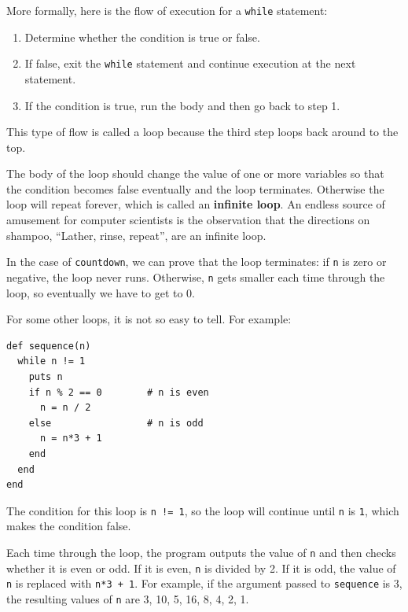\documentclass[10pt]{book}
\begin{document}
More formally, here is the flow of execution for a {\tt while} statement:

\begin{enumerate}

\item Determine whether the condition is true or false.

\item If false, exit the {\tt while} statement
and continue execution at the next statement.

\item If the condition is true, run the
body and then go back to step 1.

\end{enumerate}

This type of flow is called a loop because the third step
loops back around to the top.  

The body of the loop should change the value of one or more variables
so that the condition becomes false eventually and the loop
terminates.  Otherwise the loop will repeat forever, which is called
an {\bf infinite loop}.  An endless source of amusement for computer
scientists is the observation that the directions on shampoo,
``Lather, rinse, repeat'', are an infinite loop.

In the case of {\tt countdown}, we can prove that the loop
terminates: if {\tt n} is zero or negative, the loop never runs.
Otherwise, {\tt n} gets smaller each time through the
loop, so eventually we have to get to 0.

For some other loops, it is not so easy to tell.  For example:

\begin{verbatim}
def sequence(n)
  while n != 1
    puts n
    if n % 2 == 0        # n is even
      n = n / 2
    else                 # n is odd
      n = n*3 + 1
    end
  end
end
\end{verbatim}
%
The condition for this loop is {\tt n != 1}, so the loop will continue
until {\tt n} is {\tt 1}, which makes the condition false.

Each time through the loop, the program outputs the value of {\tt n}
and then checks whether it is even or odd.  If it is even, {\tt n} is
divided by 2.  If it is odd, the value of {\tt n} is replaced with
{\tt n*3 + 1}. For example, if the argument passed to {\tt sequence}
is 3, the resulting values of {\tt n} are 3, 10, 5, 16, 8, 4, 2, 1.
\end{document}
